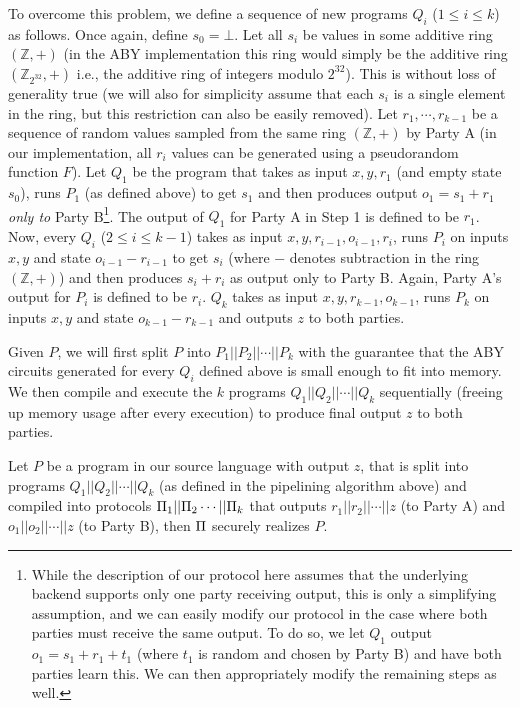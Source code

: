To overcome this problem, we define a sequence of new programs $Q_i$ ($1\leq i\leq k$) as follows. Once again, define $s_0 = \bot$. Let all $s_i$ be values in some additive ring $(\mathbb{Z},+)$ (in the ABY implementation this ring would simply be the additive ring $(\mathbb{Z}_{2^{32}},+)$ i.e., the additive ring of integers modulo $2^{32}$). This is without loss of generality true (we will also for simplicity assume that each $s_i$ is a single element in the ring, but this restriction can also be easily removed). Let $r_1,\cdots,r_{k-1}$ be a sequence of random values sampled from the same ring $(\mathbb{Z},+)$ by Party A (in our implementation, all $r_i$ values can be generated using a pseudorandom function $F$). Let $Q_1$ be the program that takes as input $x,y, r_1$ (and empty state $s_0$), runs $P_1$ (as defined above) to get $s_1$ and then produces output $o_1 = s_1 + r_1$ {\em only to} Party B\footnote{While the description of our protocol here assumes that the underlying backend supports only one party receiving output, this is only a simplifying assumption, and we can easily modify our protocol in the case where both parties must receive the same output. To do so, we let $Q_1$ output $o_1 = s_1+r_1+t_1$ (where $t_1$ is random and chosen by Party B) and have both parties learn this. We can then appropriately modify the remaining steps as well.}. The output of $Q_1$ for Party A in Step 1 is defined to be $r_1$. Now, every $Q_i$ ($2\leq i\leq k-1$) takes as input $x,y,r_{i-1},o_{i-1},r_i$, runs $P_i$ on inputs $x,y$ and state $o_{i-1}-r_{i-1}$ to get $s_i$ (where $-$ denotes subtraction in the ring $(\mathbb{Z},+)$) and then produces $s_i+r_i$ as output only to Party B. Again, Party A's output for $P_i$ is defined to be $r_i$. $Q_k$ takes as input $x,y,r_{k-1},o_{k-1}$, runs $P_k$ on inputs $x,y$ and state $o_{k-1}-r_{k-1}$ and outputs $z$ to both parties.

Given $P$, we will first split $P$ into $P_1||P_2||\cdots||P_k$ with the guarantee that the ABY circuits generated for every $Q_i$ defined above is small enough to fit into memory. We then compile and execute the $k$ programs $Q_1||Q_2||\cdots||Q_k$ sequentially (freeing up memory usage after every execution) to produce final output $z$ to both parties.

\begin{theorem}
Let $P$ be a program in our source language with output $z$, that is split into programs $Q_1||Q_2||\cdots ||Q_k$ (as defined in the pipelining algorithm above) and compiled into protocols $\Pi_1||\Pi_2\cdots ||\Pi_k$ that outputs $r_1||r_2||\cdots||z$ (to Party A) and $o_1||o_2||\cdots||z$ (to Party B), then $\Pi$ securely realizes $P$.  
\end{theorem}

